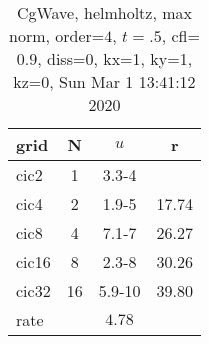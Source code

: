 \begin{table}[H]\tableFont %
\begin{center}
\begin{tabular}{|l|c|c|c|} \hline 
grid  & N &  $ u $ & r \\ \hline 
      cic2 &     1 & \num{3.3}{-4} &       \\ \hline
      cic4 &     2 & \num{1.9}{-5} & 17.74  \\ \hline
      cic8 &     4 & \num{7.1}{-7} & 26.27  \\ \hline
     cic16 &     8 & \num{2.3}{-8} & 30.26  \\ \hline
     cic32 &    16 & \num{5.9}{-10} & 39.80  \\ \hline
    rate             &       &  $4.78$       &       \\ \hline
\end{tabular}
\caption{CgWave, helmholtz, max norm, order=$4$, $t=.5$, cfl=$0.9$, diss=$0$, kx=1, ky=1, kz=0, Sun Mar  1 13:41:12 2020}\label{table:helmholtzOrder4max}
\end{center}
\end{table}
